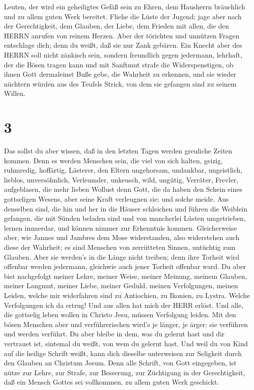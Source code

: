 Leuten, der wird ein geheiligtes Gefäß sein zu Ehren, dem Hausherrn
bräuchlich und zu allem guten Werk bereitet.  Fliehe die
Lüste der Jugend; jage aber nach der Gerechtigkeit, dem Glauben, der
Liebe, dem Frieden mit allen, die den HERRN anrufen von reinem Herzen.
 Aber der törichten und unnützen Fragen entschlage dich;
denn du weißt, daß sie nur Zank gebären.  Ein Knecht aber
des HERRN soll nicht zänkisch sein, sondern freundlich gegen jedermann,
lehrhaft, der die Bösen tragen kann  und mit Sanftmut
strafe die Widerspenstigen, ob ihnen Gott dermaleinst Buße gebe, die
Wahrheit zu erkennen,  und sie wieder nüchtern würden aus
des Teufels Strick, von dem sie gefangen sind zu seinem Willen.

\hypertarget{section-2}{%
\section{3}\label{section-2}}

 Das sollst du aber wissen, daß in den letzten Tagen werden
greuliche Zeiten kommen.  Denn es werden Menschen sein, die
viel von sich halten, geizig, ruhmredig, hoffärtig, Lästerer, den Eltern
ungehorsam, undankbar, ungeistlich,  lieblos, unversöhnlich,
Verleumder, unkeusch, wild, ungütig,  Verräter, Frevler,
aufgeblasen, die mehr lieben Wollust denn Gott,  die da
haben den Schein eines gottseligen Wesens, aber seine Kraft verleugnen
sie; und solche meide.  Aus denselben sind, die hin und her
in die Häuser schleichen und führen die Weiblein gefangen, die mit
Sünden beladen sind und von mancherlei Lüsten umgetrieben, 
lernen immerdar, und können nimmer zur Erkenntnis kommen. 
Gleicherweise aber, wie Jannes und Jambres dem Mose widerstanden, also
widerstehen auch diese der Wahrheit; es sind Menschen von zerrütteten
Sinnen, untüchtig zum Glauben.  Aber sie werden's in die
Länge nicht treiben; denn ihre Torheit wird offenbar werden jedermann,
gleichwie auch jener Torheit offenbar ward.  Du aber bist
nachgefolgt meiner Lehre, meiner Weise, meiner Meinung, meinem Glauben,
meiner Langmut, meiner Liebe, meiner Geduld,  meinen
Verfolgungen, meinen Leiden, welche mir widerfahren sind zu Antiochien,
zu Ikonien, zu Lystra. Welche Verfolgungen ich da ertrug! Und aus allen
hat mich der HERR erlöst.  Und alle, die gottselig leben
wollen in Christo Jesu, müssen Verfolgung leiden.  Mit den
bösen Menschen aber und verführerischen wird's je länger, je ärger: sie
verführen und werden verführt.  Du aber bleibe in dem, was
du gelernt hast und dir vertrauet ist, sintemal du weißt, von wem du
gelernt hast.  Und weil du von Kind auf die heilige Schrift
weißt, kann dich dieselbe unterweisen zur Seligkeit durch den Glauben an
Christum Jesum.  Denn alle Schrift, von Gott eingegeben,
ist nütze zur Lehre, zur Strafe, zur Besserung, zur Züchtigung in der
Gerechtigkeit,  daß ein Mensch Gottes sei vollkommen, zu
allem guten Werk geschickt.

